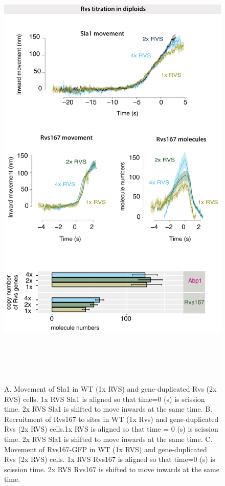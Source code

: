 \newpage
						\begin{figure}[H]
				\centering
				\includegraphics[width=22cm,height=22cm,keepaspectratio]{figures/results_final/protein_friction2}
				\caption[Dynamics of endocytosis in diploid strains with gene duplicated Rvs]
				{A. Movement of Sla1 in WT (1x RVS) and gene-duplicated Rvs (2x RVS) cells. 1x RVS Sla1 is aligned so that time=0 (s) is scission time. 2x RVS Sla1 is shifted to move inwards at the same time.
					B. Recruitment of Rvs167 to sites in WT (1x Rvs)  and gene-duplicated Rvs (2x RVS) cells.1x RVS is aligned so that time = 0 (s) is scission time. 2x RVS Sla1 is shifted to move inwards at the same time.
					C.  Movement of Rvs167-GFP in WT (1x RVS) and gene-duplicated Rvs (2x RVS) cells. 1x RVS Rvs167 is aligned so that time=0 (s) is scission time. 2x RVS Rvs167 is shifted to move inwards at the same time.
					\label{fig_rvsdiploid}}
				\end{figure}
			
